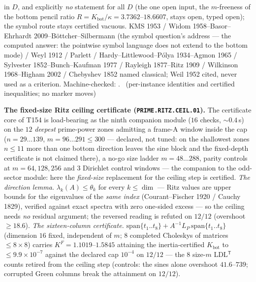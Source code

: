 in $D$, and explicitly \emph{no} statement for all $D$ (the one open
input, the $m$-freeness of the bottom pencil ratio
$R=K_{\mathrm{bot}}/\kappa=3.7362$--$18.6607$, stays open, typed open);
the symbol route stays certified vacuous.
KMS 1953 / Widom 1958--Basor--Ehrhardt 2009--B\"ottcher--Silbermann (the
symbol question's address --- the computed answer: the pointwise symbol
language does not extend to the bottom mode) / Weyl 1912 / Parlett /
Hardy--Littlewood--P\'olya 1934--Agmon 1965 / Sylvester
1852--Bunch--Kaufman 1977 / Rayleigh 1877--Ritz 1909 / Wilkinson
1968--Higham 2002 / Chebyshev 1852 named classical; Weil 1952 cited, never
used as a criterion.
Machine-checked:
.
\mE\ (per-instance identities and certified inequalities; no marker moves)


\par\smallskip\noindent\textbf{The fixed-size Ritz ceiling certificate
(\texttt{PRIME.RITZ.CEIL.01}).}
The certificate core of T154 is load-bearing as the ninth companion module
($16$ checks, ${\sim}0.4$\,s) on the $12$ \emph{deepest} prime-power zones
admitting a frame-A window inside the cap ($n=29\ldots139$,
$m=96\ldots291\le300$ --- declared, not tuned: on the shallowest zones
$n\le11$ more than one bottom direction leaves the sine block and the
fixed-depth certificate is not claimed there), a no-go size ladder
$m=48\ldots288$, parity controls at $m=64,128,256$ and $3$ Dirichlet
control windows --- the companion to the odd-sector module: here the
\emph{fixed-size} replacement for the ceiling step is certified.
\emph{The direction lemma.} $\lambda_k(A)\le\theta_k$ for every
$k\le\dim$ --- Ritz values are upper bounds for the eigenvalues of the
\emph{same index} (Courant--Fischer 1920 / Cauchy 1829), verified against
exact spectra with zero one-sided excess --- so the ceiling needs
\emph{no} residual argument; the reversed reading is refuted on $12/12$
(overshoot $\ge18.6$).
\emph{The sixteen-column certificate.}
$\mathrm{span}\{t_1..t_8\}+A^{-1}L_P\,\mathrm{span}\{t_1..t_8\}$ (dimension
$16$ fixed, independent of $m$; $8$ completed Choleskys of matrices
$\le8\times8$) carries $K^F=1.1019$--$1.5845$ attaining the
inertia-certified $K_{\mathrm{bot}}$ to $\le9.9\times10^{-7}$ against the
declared cap $10^{-4}$ on $12/12$ --- the $8$ size-$m$
LDL$^{\mathsf T}$ counts retired from the ceiling step (controls: the
sines alone overshoot $41.6$--$739$; corrupted Green columns break the
attainment on $12/12$).
